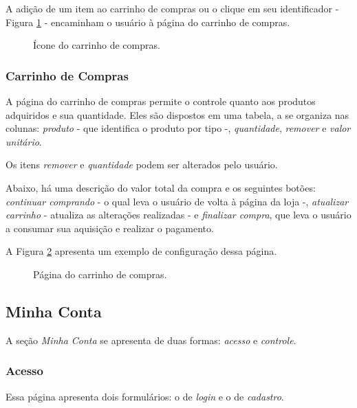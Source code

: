 \documentclass[a4paper, 12pt]{article}
\begin{document}
A adição de um item ao carrinho de compras ou o clique em seu identificador - Figura \ref{fig:carrinho} - encaminham o usuário à página do carrinho de compras.

\begin{figure}[!ht]
	\centering
	\caption{Ícone do carrinho de compras.}
	\label{fig:carrinho}
\end{figure}

\subsubsection{Carrinho de Compras}

A página do carrinho de compras permite o controle quanto aos produtos adquiridos e sua quantidade. Eles são dispostos em uma tabela, a se organiza nas colunas: \textit{produto} - que identifica o produto por tipo -, \textit{quantidade}, \textit{remover} e \textit{valor unitário}.

Os itens \textit{remover} e \textit{quantidade} podem ser alterados pelo usuário.

Abaixo, há uma descrição do valor total da compra e os seguintes botões: \textit{continuar comprando} - o qual leva o usuário de volta à página da loja -, \textit{atualizar carrinho} - atualiza as alterações realizadas - e \textit{finalizar compra}, que leva o usuário a consumar sua aquisição e realizar o pagamento.

A Figura \ref{fig:carrinhopagina} apresenta um exemplo de configuração dessa página.

\begin{figure}[!ht]
	\centering
	\caption{Página do carrinho de compras.}
	\label{fig:carrinhopagina}
\end{figure}

\subsection{Minha Conta}

A seção \textit{Minha Conta} se apresenta de duas formas: \textit{acesso} e \textit{controle}.

\subsubsection{Acesso}

Essa página apresenta dois formulários: o de \textit{login} e o de \textit{cadastro}.
\end{document}

